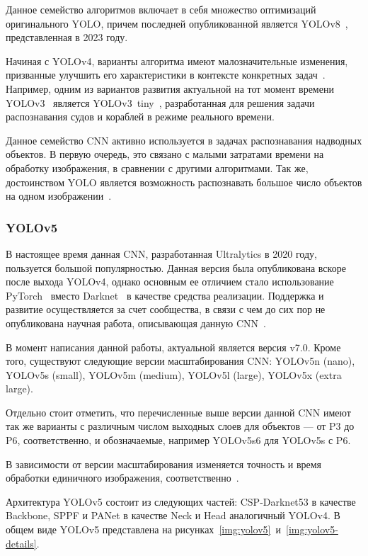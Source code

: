 Данное семейство алгоритмов включает в себя множество оптимизаций оригинального YOLO, причем последней опубликованной является YOLOv8~\cite{yolo-review-2023}, представленная в 2023 году.

Начиная с YOLOv4, варианты алгоритма имеют малозначительные изменения, призванные улучшить его характеристики в контексте конкретных задач~\cite{yolov3-ships}. Например, одним из вариантов развития актуальной на тот момент времени YOLOv3~\cite{yolov3} является YOLOv3~tiny~\cite{yolov3-tiny}, разработанная для решения задачи распознавания судов и кораблей в режиме реального времени.

Данное семейство CNN активно используется в задачах распознавания надводных объектов. В первую очередь, это связано с малыми затратами времени на обработку изображения, в сравнении с другими алгоритмами. Так же, достоинством YOLO является возможность распознавать большое число объектов на одном изображении~\cite{yolo9000}.

\subsubsection{YOLOv5}

В настоящее время данная CNN, разработанная Ultralytics в 2020 году, пользуется большой популярностью. Данная версия была опубликована вскоре после выхода YOLOv4, однако основным ее отличием стало использование PyTorch~\cite{pytorch} вместо Darknet~\cite{darknet} в качестве средства реализации. Поддержка и развитие осуществляется за счет сообщества, в связи с чем до сих пор не опубликована научная работа, описывающая данную CNN~\cite{yolo-review-2023}.

В момент написания данной работы, актуальной является версия v7.0. Кроме того, существуют следующие версии масштабирования CNN: YOLOv5n (nano), YOLOv5s (small), YOLOv5m (medium), YOLOv5l (large), YOLOv5x (extra large).

Отдельно стоит отметить, что перечисленные выше версии данной CNN имеют так же варианты с различным числом выходных слоев для объектов --- от P3 до P6, соответственно, и обозначаемые, например YOLOv5s6 для YOLOv5s с P6.

В зависимости от версии масштабирования изменяется точность и время обработки единичного изображения, соответственно~\cite{yolo-review-2023}.

Архитектура YOLOv5 состоит из следующих частей: CSP-Darknet53 в качестве Backbone, SPPF и PANet в качестве Neck и Head аналогичный YOLOv4. В общем виде YOLOv5 представлена на рисунках~\ref{img:yolov5}~и~\ref{img:yolov5-details}.

